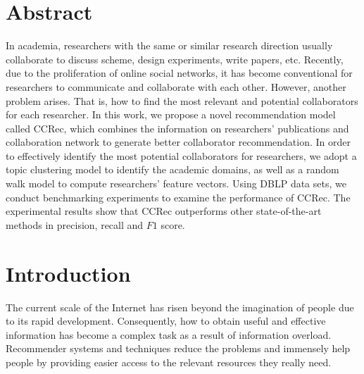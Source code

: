 \documentclass[10pt,letterpaper]{article}
\begin{document}
\section*{Abstract}
In academia, researchers with the same or similar research direction usually collaborate to discuss scheme, design experiments, write papers, etc. Recently, due to the proliferation of online social networks, it has become conventional for researchers to communicate and collaborate with each other. However, another problem arises. That is, how to find the most relevant and potential collaborators for each researcher. In this work, we propose a novel recommendation model called CCRec, which combines the information on researchers' publications and collaboration network to generate better collaborator recommendation. In order to effectively identify the most potential collaborators for researchers, we adopt a topic clustering model to identify the academic domains, as well as a random walk model to compute researchers' feature vectors. Using DBLP data sets, we conduct benchmarking experiments to examine the performance of CCRec. The experimental results show that CCRec outperforms other state-of-the-art methods in precision, recall and $F1$ score.



\linenumbers

\section*{Introduction}
The current scale of the Internet has risen beyond the imagination of people due to its rapid development. Consequently, how to obtain useful and effective information has become a complex task as a result of information overload. Recommender systems and techniques reduce the problems and immensely help people by providing easier access to the relevant resources they really need.
\end{document}
